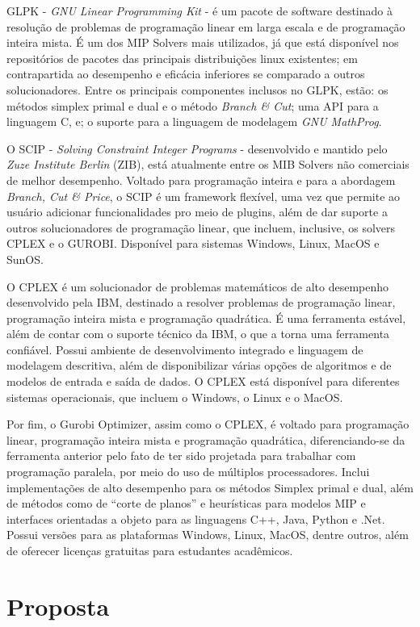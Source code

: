 \documentclass[a4paper,10pt]{article}
\newcommand{\fw}[1]{\emph{#1}}
\begin{document}
GLPK - \fw{GNU Linear Programming Kit} - é um pacote de software destinado à
resolução de problemas de programação linear em larga escala e de programação
inteira mista. É um dos MIP Solvers mais utilizados, já que está disponível nos
repositórios de pacotes das principais distribuições linux existentes; em
contrapartida ao desempenho e eficácia inferiores se comparado a outros
solucionadores. Entre os principais componentes inclusos no GLPK, estão:
os métodos simplex primal e dual e o método \fw{Branch \& Cut}; uma API para a
linguagem C, e; o suporte para a linguagem de modelagem \fw{GNU MathProg}.

O SCIP - \fw{Solving Constraint Integer Programs} - desenvolvido e mantido pelo \fw{Zuze Institute Berlin} (ZIB), está atualmente entre os MIB Solvers não comerciais de melhor desempenho. Voltado para programação inteira e para a abordagem \fw{Branch, Cut \& Price}, o SCIP é um framework flexível, uma vez que permite ao usuário adicionar funcionalidades pro meio de plugins, além de dar suporte a outros solucionadores de programação linear, que incluem, inclusive, os solvers CPLEX e o GUROBI. Disponível para sistemas Windows, Linux, MacOS e SunOS.

O CPLEX é um solucionador de problemas matemáticos de alto desempenho desenvolvido pela IBM, destinado a resolver problemas de programação linear, programação inteira mista e programação quadrática. É uma ferramenta estável, além de contar com o suporte técnico da IBM, o que a torna uma ferramenta confiável. Possui ambiente de desenvolvimento integrado e linguagem de modelagem descritiva, além de disponibilizar várias opções de algoritmos e de modelos de entrada e saída de dados. O CPLEX está disponível para diferentes sistemas operacionais, que incluem o Windows, o Linux e o MacOS.

Por fim, o Gurobi Optimizer, assim como o CPLEX, é voltado para programação linear, programação inteira mista e programação quadrática, diferenciando-se da ferramenta anterior pelo fato de ter sido projetada para trabalhar com programação paralela, por meio do uso de múltiplos processadores. Inclui implementações de alto desempenho para os métodos Simplex primal e dual, além de métodos como de ``corte de planos'' e heurísticas para modelos MIP e interfaces orientadas a objeto para as linguagens C++, Java, Python e .Net. Possui versões para as plataformas Windows, Linux, MacOS, dentre outros, além de oferecer licenças gratuitas para estudantes acadêmicos.

\section{Proposta}
\label{sec:prop}
\end{document}
